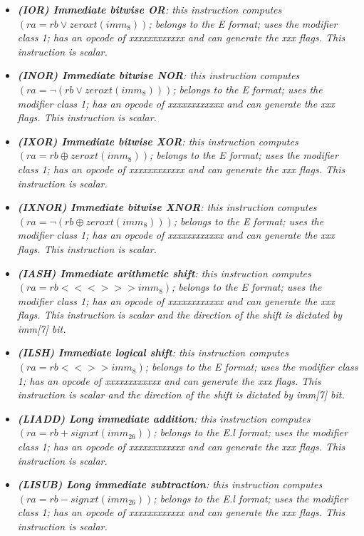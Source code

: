 \begin{multicols}{2}
\begin{itemize}
                \item \textit{\textbf{(IOR) Immediate bitwise OR}: this instruction computes \((ra = rb \vee zeroxt(imm_8))\); belongs to the E format; uses the modifier class 1; has an opcode of xxxxxxxxxxxx and can generate the xxx flags. This instruction is scalar.}

                \item \textit{\textbf{(INOR) Immediate bitwise NOR}: this instruction computes \((ra = \neg(rb \vee zeroxt(imm_8)))\); belongs to the E format; uses the modifier class 1; has an opcode of xxxxxxxxxxxx and can generate the xxx flags. This instruction is scalar.}

                \item \textit{\textbf{(IXOR) Immediate bitwise XOR}: this instruction computes \((ra = rb \oplus zeroxt(imm_8))\); belongs to the E format; uses the modifier class 1; has an opcode of xxxxxxxxxxxx and can generate the xxx flags. This instruction is scalar.}

                \item \textit{\textbf{(IXNOR) Immediate bitwise XNOR}: this instruction computes \((ra = \neg(rb \oplus zeroxt(imm_8)))\); belongs to the E format; uses the modifier class 1; has an opcode of xxxxxxxxxxxx and can generate the xxx flags. This instruction is scalar.}

                \item \textit{\textbf{(IASH) Immediate arithmetic shift}: this instruction computes \((ra = rb <<<>>> imm_8)\); belongs to the E format; uses the modifier class 1; has an opcode of xxxxxxxxxxxx and can generate the xxx flags. This instruction is scalar and the direction of the shift is dictated by imm[7] bit.}

                \item \textit{\textbf{(ILSH) Immediate logical shift}: this instruction computes \((ra = rb <<>> imm_8)\); belongs to the E format; uses the modifier class 1; has an opcode of xxxxxxxxxxxx and can generate the xxx flags. This instruction is scalar and the direction of the shift is dictated by imm[7] bit.}

                \item \textit{\textbf{(LIADD) Long immediate addition}: this instruction computes \((ra = rb + signxt(imm_{26}))\); belongs to the E.l format; uses the modifier class 1; has an opcode of xxxxxxxxxxxx and can generate the xxx flags. This instruction is scalar.}

                \item \textit{\textbf{(LISUB) Long immediate subtraction}: this instruction computes \((ra = rb - signxt(imm_{26}))\); belongs to the E.l format; uses the modifier class 1; has an opcode of xxxxxxxxxxxx and can generate the xxx flags. This instruction is scalar.}


\end{itemize}
\end{multicols}
